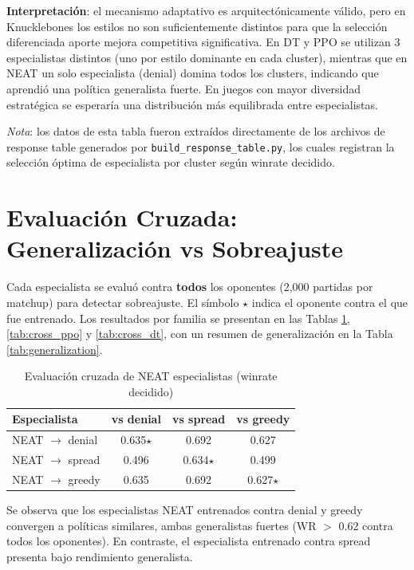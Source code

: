 \textbf{Interpretación}: el mecanismo adaptativo es arquitectónicamente válido, pero en Knucklebones los estilos no son suficientemente distintos para que la selección diferenciada aporte mejora competitiva significativa. En DT y PPO se utilizan 3 especialistas distintos (uno por estilo dominante en cada cluster), mientras que en NEAT un solo especialista (denial) domina todos los clusters, indicando que aprendió una política generalista fuerte. En juegos con mayor diversidad estratégica se esperaría una distribución más equilibrada entre especialistas.

\textit{Nota}: los datos de esta tabla fueron extraídos directamente de los archivos de response table generados por \texttt{build\_response\_table.py}, los cuales registran la selección óptima de especialista por cluster según winrate decidido.

\section{Evaluación Cruzada: Generalización vs Sobreajuste}

Cada especialista se evaluó contra \textbf{todos} los oponentes (2,000 partidas por matchup) para detectar sobreajuste. El símbolo $\star$ indica el oponente contra el que fue entrenado. Los resultados por familia se presentan en las Tablas \ref{tab:cross_neat}, \ref{tab:cross_ppo} y \ref{tab:cross_dt}, con un resumen de generalización en la Tabla \ref{tab:generalization}.

\begin{table}[H]
\centering
\caption{Evaluación cruzada de NEAT especialistas (winrate decidido)}
\begin{tabular}{lccc}
\hline
\textbf{Especialista} & \textbf{vs denial} & \textbf{vs spread} & \textbf{vs greedy} \\
\hline
NEAT $\to$ denial & 0.635$\star$ & 0.692 & 0.627 \\
NEAT $\to$ spread & 0.496 & 0.634$\star$ & 0.499 \\
NEAT $\to$ greedy & 0.635 & 0.692 & 0.627$\star$ \\
\hline
\end{tabular}
\label{tab:cross_neat}
\end{table}

Se observa que los especialistas NEAT entrenados contra denial y greedy convergen a políticas similares, ambas generalistas fuertes (WR $>$ 0.62 contra todos los oponentes). En contraste, el especialista entrenado contra spread presenta bajo rendimiento generalista.

